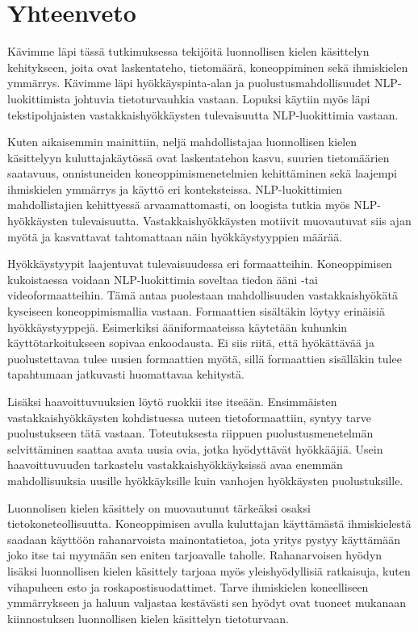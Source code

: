 \chapter{Yhteenveto\label{conclusions}}

Kävimme läpi tässä tutkimuksessa tekijöitä luonnollisen kielen käsittelyn kehitykseen, joita ovat laskentateho, tietomäärä, koneoppiminen sekä ihmiskielen ymmärrys. Kävimme läpi hyökkäyspinta-alan ja puolustusmahdollisuudet NLP-luokittimista johtuvia tietoturvauhkia vastaan. Lopuksi käytiin myös läpi tekstipohjaisten vastakkaishyökkäysten tulevaisuutta NLP-luokittimia vastaan.

Kuten aikaisemmin mainittiin, neljä mahdollistajaa luonnollisen kielen käsittelyyn kuluttajakäytössä ovat laskentatehon kasvu, suurien tietomäärien saatavuus, onnistuneiden koneoppimismenetelmien kehittäminen sekä laajempi ihmiskielen ymmärrys ja käyttö eri konteksteissa. NLP-luokittimien mahdollistajien kehittyessä arvaamattomasti, on loogista tutkia myös NLP-hyökkäysten tulevaisuutta. Vastakkaishyökkäysten motiivit muovautuvat siis ajan myötä ja kasvattavat tahtomattaan näin hyökkäystyyppien määrää. 

Hyökkäystyypit laajentuvat tulevaisuudessa eri formaatteihin. Koneoppimisen kukoistaessa voidaan NLP-luokittimia soveltaa tiedon ääni -tai videoformaatteihin. Tämä antaa puolestaan mahdollisuuden vastakkaishyökätä kyseiseen koneoppimismallia vastaan. Formaattien sisältäkin löytyy erinäisiä hyökkäystyyppejä. Esimerkiksi ääniformaateissa käytetään kuhunkin käyttötarkoitukseen sopivaa enkoodausta. Ei siis riitä, että hyökättävää ja puolustettavaa tulee uusien formaattien myötä, sillä formaattien sisälläkin tulee tapahtumaan jatkuvasti huomattavaa kehitystä.

Lisäksi haavoittuvuuksien löytö ruokkii itse itseään. Ensimmäisten vastakkaishyökkäysten kohdistuessa uuteen tietoformaattiin, syntyy tarve puolustukseen tätä vastaan. Toteutuksesta riippuen puolustusmenetelmän selvittäminen saattaa avata uusia ovia, jotka hyödyttävät hyökkääjiä. Usein haavoittuvuuden tarkastelu vastakkaishyökkäyksissä avaa enemmän mahdollisuuksia uusille hyökkäyksille kuin vanhojen hyökkäysten puolustuksille.

Luonnolisen kielen käsittely on muovautunut tärkeäksi osaksi tietokoneteollisuutta. Koneoppimisen avulla kuluttajan käyttämästä ihmiskielestä saadaan käyttöön rahanarvoista mainontatietoa, jota yritys pystyy käyttämään joko itse tai myymään sen eniten tarjoavalle taholle. Rahanarvoisen hyödyn lisäksi luonnollisen kielen käsittely tarjoaa myös yleishyödyllisiä ratkaisuja, kuten vihapuheen esto ja roskapostisuodattimet. Tarve ihmiskielen koneelliseen ymmärrykseen ja haluun valjastaa kestävästi sen hyödyt ovat tuoneet mukanaan kiinnostuksen luonnollisen kielen käsittelyn tietoturvaan.